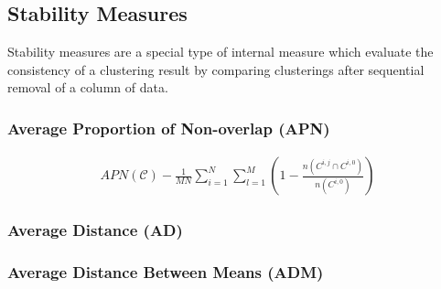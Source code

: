 \subsection{Stability Measures}
Stability  measures  are a  special  type  of  internal measure  which
evaluate  the   consistency  of  a  clustering   result  by  comparing
clusterings after sequential removal of a column of data.

\subsubsection{Average Proportion of Non-overlap (APN)}

\begin{gather}
APN(\mathcal{C}) - \frac{1}{MN} \sum_{i=1}^{N}\sum_{l=1}^{M} \left( 1
- \frac{n(C^{i,j} \cap C^{i,0})}{n(C^{i,0})} \right)
\end{gather}  


\subsubsection{Average Distance (AD)}



\subsubsection{Average Distance Between Means (ADM)}








